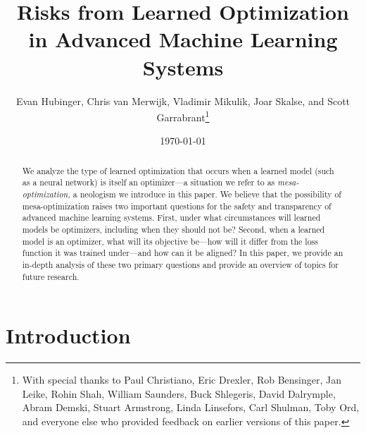 \documentclass[
  onecolumn,
  natbib,
]{miri-tech-article}
\begin{document}
\title{Risks from Learned Optimization \\ in Advanced Machine Learning Systems}
\author{Evan Hubinger, Chris van Merwijk, Vladimir Mikulik, Joar Skalse, and Scott Garrabrant\thanks{With special thanks to Paul Christiano, Eric Drexler, Rob Bensinger, Jan Leike, Rohin Shah, William Saunders, Buck Shlegeris, David Dalrymple, Abram Demski, Stuart Armstrong, Linda Linsefors, Carl Shulman, Toby Ord, and everyone else who provided feedback on earlier versions of this paper.}}

\date{\today}


\maketitle

\begin{abstract}
We analyze the type of learned optimization that occurs when a learned model (such as a neural network) is itself an optimizer---a situation we refer to as \textit{mesa-optimization,} a neologism we introduce in this paper. We believe that the possibility of mesa-optimization raises two important questions for the safety and transparency of advanced machine learning systems. First, under what circumstances will learned models be optimizers, including when they should not be? Second, when a learned model is an optimizer, what will its objective be---how will it differ from the loss function it was trained under---and how can it be aligned? In this paper, we provide an in-depth analysis of these two primary questions and provide an overview of topics for future research.
\end{abstract}

\tableofcontents

\section{Introduction}
\label{sec:1}
\end{document}
